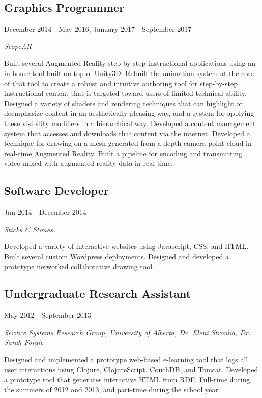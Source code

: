 \documentclass[10pt]{article}
\begin{document}
\subsection*{Graphics Programmer}
December 2014 - May 2016, January 2017 - September 2017

\emph{ScopeAR}
\vspace{\baselineskip}

Built several Augmented Reality step-by-step instructional applications using an in-house tool built on top of Unity3D. Rebuilt the animation system at the core of that tool to create a robust and intuitive authoring tool for step-by-step instructional content that is targeted toward users of limited technical ability. Designed a variety of shaders and rendering techniques that can highlight or deemphasize content in an aesthetically pleasing way, and a system for applying these visibility modifiers in a hierarchical way. Developed a content management system that accesses and downloads that content via the internet. Developed a technique for drawing on a mesh generated from a depth-camera point-cloud in real-time Augmented Reality. Built a pipeline for encoding and transmitting video mixed with augmented reality data in real-time.

\subsection*{Software Developer}
Jan 2014 - December 2014

\emph{Sticks \& Stones}
\vspace{\baselineskip}

Developed a variety of interactive websites using Javascript, CSS, and HTML. Built several custom Wordpress deployments. Designed and developed a prototype networked collaborative drawing tool.

\subsection*{Undergraduate Research Assistant}
May 2012 - September 2013

\emph{Service Systems Research Group, University of Alberta, Dr. Eleni Stroulia, Dr. Sarah Forgie}
\vspace{\baselineskip}

Designed and implemented a prototype web-based e-learning tool that logs all user interactions using Clojure, ClojureScript, CouchDB, and Tomcat. Developed a prototype tool that generates interactive HTML from RDF. Full-time during the summers of 2012 and 2013, and part-time during the school year.
\end{document}
